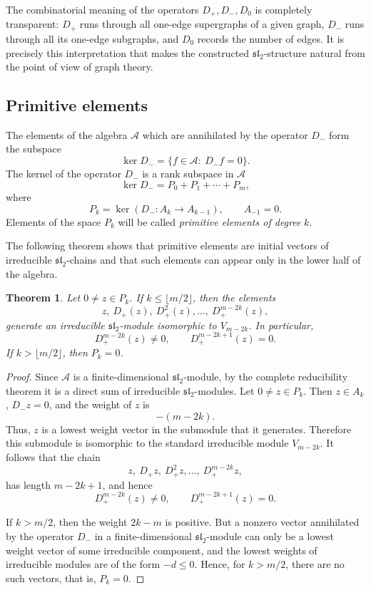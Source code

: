 \documentclass[12pt,reqno]{amsart}
\newtheorem{theorem}{Theorem}[section]
\begin{document}
The combinatorial meaning of the operators $D_+,D_-,D_0$ is completely
transparent: $D_+$ runs through all one-edge supergraphs of a given graph,
$D_-$ runs through all its one-edge subgraphs, and $D_0$ records the number
of edges.
It is precisely this interpretation that makes the constructed
$\mathfrak{sl}_2$-structure natural from the point of view of graph theory.

\subsection{Primitive elements}

The elements of the algebra $\mathcal A$ which are annihilated by the operator
$D_-$ form the subspace
$$
\ker D_-=\{f\in\mathcal A:\ D_-f=0\}.
$$
The kernel of the operator $D_-$ is a rank subspace in $\mathcal A$
$$
\ker D_-= P_0+P_1+ \cdots + P_m,
$$
where
$$
P_k=\ker\left(D_-:A_k\longrightarrow A_{k-1}\right),
\qquad A_{-1}=0.
$$
Elements of the space $P_k$ will be called \emph{primitive elements of degree}
$k$.

The following theorem shows that primitive elements are initial vectors of
irreducible $\mathfrak{sl}_2$-chains and that such elements can appear only
in the lower half of the algebra.
\begin{theorem}\label{primitive_chain}
Let $0\neq z\in P_k$. If $k\le \lfloor m/2\rfloor$, then the elements
$$
z,\ D_+(z),\ D_+^2(z),\dots,\ D_+^{m-2k}(z),
$$
generate an irreducible $\mathfrak{sl}_2$-module isomorphic to $V_{m-2k}$.
In particular,
$$
D_+^{m-2k}(z)\neq 0,
\qquad
D_+^{m-2k+1}(z)=0.
$$
If $k>\lfloor m/2\rfloor$, then $P_k=0$.
\end{theorem}

\begin{proof}
Since $\mathcal A$ is a finite-dimensional $\mathfrak{sl}_2$-module, by the
complete reducibility theorem it is a direct sum of irreducible
$\mathfrak{sl}_2$-modules. Let $0\neq z\in P_k$. Then $z\in A_k$,
$D_-z=0$, and the weight of $z$ is
$$
-(m-2k).
$$
Thus, $z$ is a lowest weight vector in the submodule that it generates.
Therefore this submodule is isomorphic to the standard irreducible module
$V_{m-2k}$. It follows that the chain
$$
z,\ D_+z,\ D_+^2z,\dots,\ D_+^{m-2k}z,
$$
has length $m-2k+1$, and hence
$$
D_+^{m-2k}(z)\neq 0,
\qquad
D_+^{m-2k+1}(z)=0.
$$

If $k>m/2$, then the weight $2k-m$ is positive. But a nonzero vector
annihilated by the operator $D_-$ in a finite-dimensional
$\mathfrak{sl}_2$-module can only be a lowest weight vector of some
irreducible component, and the lowest weights of irreducible modules are of
the form $-d\le 0$. Hence, for $k>m/2$, there are no such vectors, that is,
$P_k=0$.
\end{proof}
\end{document}
